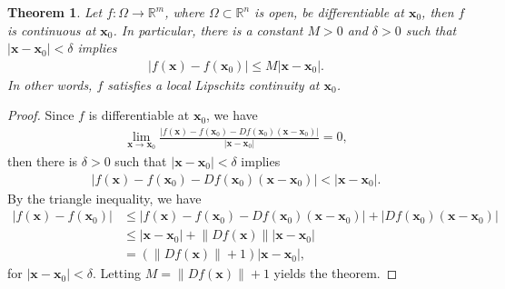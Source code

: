 \documentclass[10pt]{book}
\newtheorem{theorem}{Theorem}[chapter]
\theoremstyle{definition}
\numberwithin{equation}{chapter}
\begin{document}
\begin{theorem}
Let $f: \Omega \to \mathbb{R}^m$, where $\Omega \subset \mathbb{R}^n$ is open, be differentiable at $\mathbf{x}_0$, then $f$ is continuous at $\mathbf{x}_0$. In particular, there is a constant $M > 0$ and $\delta > 0$ such that $\left|\mathbf{x} - \mathbf{x}_0\right| < \delta$ implies 
\begin{align*}
    \left|f(\mathbf{x}) - f(\mathbf{x}_0)\right| \leq M \left|\mathbf{x} - \mathbf{x}_0\right|.
\end{align*}
In other words, $f$ satisfies a local Lipschitz continuity at $\mathbf{x}_0$.
\end{theorem}
\begin{proof}
Since $f$ is differentiable at $\mathbf{x}_0$, we have
\begin{align*}
    \lim_{\mathbf{x} \to \mathbf{x}_0} \frac{\left|f(\mathbf{x}) - f(\mathbf{x}_0) - Df(\mathbf{x}_0) (\mathbf{x} - \mathbf{x}_0)\right|}{\left|\mathbf{x} - \mathbf{x}_0\right|} = 0,
\end{align*}
then there is $\delta > 0$ such that $\left|\mathbf{x} - \mathbf{x}_0\right| < \delta$ implies
\begin{align*}
    \left|f(\mathbf{x}) - f(\mathbf{x}_0) - Df(\mathbf{x}_0) (\mathbf{x} - \mathbf{x}_0)\right| < \left|\mathbf{x} - \mathbf{x}_0\right|.
\end{align*}
By the triangle inequality, we have
\begin{align*}
    \left|f(\mathbf{x}) - f(\mathbf{x}_0)\right| & \leq \left|f(\mathbf{x}) - f(\mathbf{x}_0) - Df(\mathbf{x}_0) (\mathbf{x} - \mathbf{x}_0)\right| + \left|Df(\mathbf{x}_0) (\mathbf{x} - \mathbf{x}_0)\right| \\
    & \leq \left|\mathbf{x} - \mathbf{x}_0\right| + \left\|Df(\mathbf{x})\right\| \left|\mathbf{x} - \mathbf{x}_0\right| \\
    & = \left(\left\|Df(\mathbf{x})\right\| + 1\right) \left|\mathbf{x} - \mathbf{x}_0\right|,
\end{align*}
for $\left|\mathbf{x} - \mathbf{x}_0\right| < \delta$. Letting $M = \left\|Df(\mathbf{x})\right\| + 1$ yields the theorem.
\end{proof}

\medskip
\end{document}
